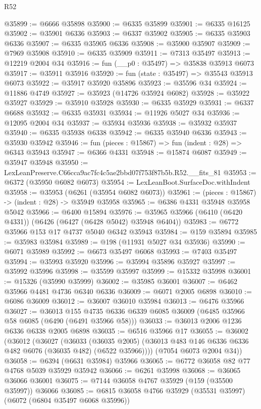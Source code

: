 \begin{lexlean}{R52}
\begin{coremodule}
@35899 := @6666 @35898
@35900 := @6335 @35899
@35901 := @6335 @16125
@35902 := @35901 @6336
@35903 := @6337 @35902
@35905 := @6335 @35903 @6336
@35907 := @6335 @35905 @6336
@35908 := @35900 @35907
@35909 := @7969 @35908
@35910 := @6335 @35909
@35911 := @7313 @35497
@35913 := @12219 @2004 @34
@35916 := fun (__p0 : @35497) => @35838 @35913 @6073
@35917 := @35911 @35916
@35920 := fun (state : @35497) => @35543 @35913 @6073
@35922 := @35917 @35920 @35896
@35923 := @35596 @34
@35924 := @11886 @4749
@35927 := @35923 (@14726 @35924 @6082)
@35928 := @35922 @35927
@35929 := @35910 @35928
@35930 := @6335 @35929
@35931 := @6337 @6688
@35932 := @6335 @35931
@35934 := @11926 @5027 @34
@35936 := @12095 @2004 @34
@35937 := @35934 @35936
@35938 := @35932 @35937
@35940 := @6335 @35938 @6338
@35942 := @6335 @35940 @6336
@35943 := @35930 @35942
@35946 := fun (pieces : @15867) => fun (indent : @28) => @6343 @35943
@35947 := @6366 @4331
@35948 := @15874 @6087
@35949 := @35947 @35948
@35950 := LexLeanPreserve.C66cca9ac7fc4c5ae2bbd07f753f87b5b.R52.__fits_81
@35953 := @6372 (@35950 @6082 @6073)
@35954 := LexLeanBoot.SurfaceDoc.withIndent
@35958 := @35953 (@6261 (@35954 @6082 @6073))
@35961 := (pieces : @15867) -> (indent : @28) -> @35949 @35958
@35965 := @6386 @4331 @35948 @35958 @5042
@35966 := @6400 @15894
@35976 := @35965 @35966 (@6410 (@6420 @4331)) (@6426 (@6427 (@6428 @5042) @35948 @6404))
@35983 := @6772 @35966 @153 @17 @4737 @5040 @6342 @35943
@35984 := @159 @35894
@35985 := @35983 @35984
@35989 := @198 (@11931 @5027 @34 @35936)
@35990 := @6071 @35989
@35992 := @6673 @35497 @6068
@35993 := @7403 @35497
@35994 := @35993 @35920
@35996 := @35994 @35896 @35927
@35997 := @35992 @35996
@35998 := @35599 @35997
@35999 := @15332 @35998
@36001 := @15326 (@35990 @35999)
@36002 := @35985 @36001
@36007 := @6462 @35966 @4481 @4736 @6340 @6336
@36009 := @6071 @2005 @6898
@36010 := @6086 @36009
@36012 := @36007 @36010 @35984
@36013 := @6476 @35966
@36027 := @36013
    @155
    @4735
    @6336
    @6339
    @6085
    @36009
    (@6485 @35966 @58 @6085 (@6490 (@6491 @35966 @58)))
@36033 := @36013 @2006 @1236 @6336 @6338 @2005 @6898
@36035 := @6516 @35966 @17
@36055 := @36002
    (@36012
      (@36027
        (@36033
          (@36035 @2005)
          (@36013 @483 @146 @6336 @6336 @482 @6076 (@36035 @482) (@6522 @35966))))
      (@7054 @6073 @2004 @34))
@36058 := @6394 (@6631 @35984) @35966
@36065 := @6772 @36058 @82 @77 @4768 @5039 @35929 @35942
@36066 := @6261 @35998
@36068 := @36065 @36066 @36001
@36075 := @7144 @36058 @4767 @35929 (@159 (@35500 @35997)) @36066
@36085 := @6815 @36058 @4766 @35929 (@35531 @35997) (@6072 (@6804 @35497 @6068 @35996))

\end{coremodule}
\end{lexlean}
